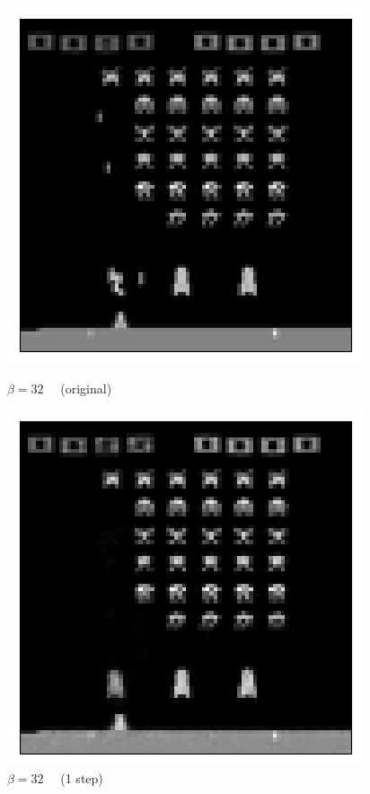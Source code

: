 \begin{figure}[h!]
\begin{multicols}{4}
    \includegraphics[scale=0.4]{figures/results/weighted_average/beta_32_posterior_sample_original.png}
    \caption{$\beta=32\quad$ (original)}
    \includegraphics[scale=0.4]{figures/results/weighted_average/beta_32_posterior_sample_1.png}
    \caption{$\beta=32\quad$ (1 step)}

\end{multicols}
\end{figure}
